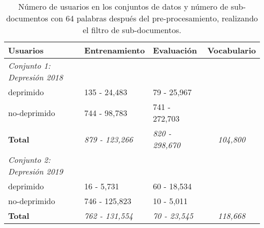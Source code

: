 \begin{table}[!hbt]
\caption{Número de usuarios en los conjuntos de datos y número de sub-documentos con 64 palabras después del pre-procesamiento, realizando el filtro de sub-documentos.} \label{table:filter_users}
\begin{center}

\begin{tabular}{llll}
\hline
\rowcolor[HTML]{FFFFFF} 
\textbf{Usuarios}                   & \textbf{Entrenamiento}                       & \textbf{Evaluación}                          & \textbf{Vocabulario}                                         \\ \hline
\rowcolor[HTML]{EFEFEF} 
\textit{Conjunto 1: Depresión 2018} & \multicolumn{1}{c}{\cellcolor[HTML]{EFEFEF}} & \multicolumn{1}{c}{\cellcolor[HTML]{EFEFEF}} &                                                              \\ \hline
\rowcolor[HTML]{FFFFFF} 
deprimido                           & 135 - 24,483                                 & 79 - 25,967                                  &                                                              \\ \hline
\rowcolor[HTML]{FFFFFF} 
no-deprimido                        & 744 - 98,783                                 & 741 - 272,703                                &                                                              \\ \hline
\rowcolor[HTML]{FFFFFF} 
\textbf{Total}                      & \textit{879 - 123,266}                       & \textit{820 - 298,670}                       & \multicolumn{1}{c}{\cellcolor[HTML]{FFFFFF}\textit{104,800}} \\ \hline
\rowcolor[HTML]{EFEFEF} 
\textit{Conjunto 2: Depresión 2019} & \multicolumn{1}{c}{\cellcolor[HTML]{EFEFEF}} & \multicolumn{1}{c}{\cellcolor[HTML]{EFEFEF}} &                                                              \\ \hline
\rowcolor[HTML]{FFFFFF} 
deprimido                           & 16 - 5,731                                   & 60 - 18,534                                  &                                                              \\ \hline
\rowcolor[HTML]{FFFFFF} 
no-deprimido                        & 746 - 125,823                                & 10 - 5,011                                   &                                                              \\ \hline
\rowcolor[HTML]{FFFFFF} 
\textbf{Total}                      & \textit{762 - 131,554}                       & \textit{70 - 23,545}                         & \multicolumn{1}{c}{\cellcolor[HTML]{FFFFFF}\textit{118,668}}    \\ \hline

\end{tabular}
\end{center}
\end{table}
